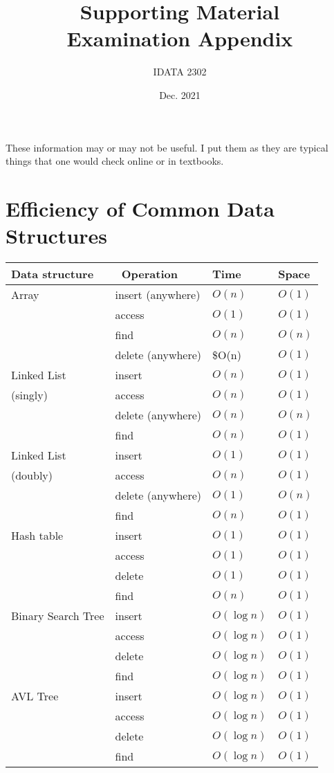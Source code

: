 \documentclass[11pt]{article}
\author{IDATA 2302}
\date{Dec. 2021}
\title{Supporting Material\\\medskip
\large Examination Appendix}
\begin{document}
\maketitle
These information may or may not be useful. I put them as they are
typical things that one would check online or in textbooks.

\section{Efficiency of Common Data Structures}
\label{sec:orgfa56201}

\begin{center}
\begin{tabular}{llll}
Data structure &  Operation & Time & Space\\
\hline
Array & insert (anywhere) & \(O(n)\) & \(O(1)\)\\
 & access & \(O(1)\) & \(O(1)\)\\
 & find & \(O(n)\) & \(O(n)\)\\
 & delete (anywhere) & \$O(n) & \(O(1)\)\\
\hline
Linked List & insert & \(O(n)\) & \(O(1)\)\\
(singly) & access & \(O(n)\) & \(O(1)\)\\
 & delete (anywhere) & \(O(n)\) & \(O(n)\)\\
 & find & \(O(n)\) & \(O(1)\)\\
\hline
Linked List & insert & \(O(1)\) & \(O(1)\)\\
(doubly) & access & \(O(n)\) & \(O(1)\)\\
 & delete (anywhere) & \(O(1)\) & \(O(n)\)\\
 & find & \(O(n)\) & \(O(1)\)\\
\hline
Hash table & insert & \(O(1)\) & \(O(1)\)\\
 & access & \(O(1)\) & \(O(1)\)\\
 & delete & \(O(1)\) & \(O(1)\)\\
 & find & \(O(n)\) & \(O(1)\)\\
\hline
Binary Search Tree & insert & \(O(\log n)\) & \(O(1)\)\\
 & access & \(O(\log n)\) & \(O(1)\)\\
 & delete & \(O(\log n)\) & \(O(1)\)\\
 & find & \(O(\log n)\) & \(O(1)\)\\
\hline
AVL Tree & insert & \(O(\log n)\) & \(O(1)\)\\
 & access & \(O(\log n)\) & \(O(1)\)\\
 & delete & \(O(\log n)\) & \(O(1)\)\\
 & find & \(O(\log n)\) & \(O(1)\)\\
\hline
\end{tabular}
\end{center}
\end{document}
